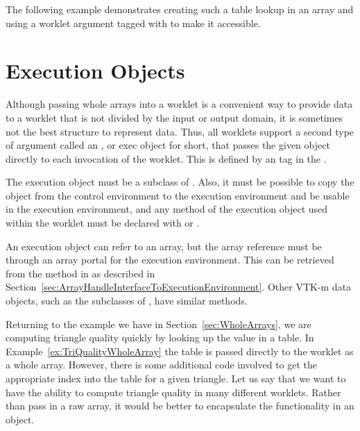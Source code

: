 The following example demonstrates creating such a table lookup in an array
and using a worklet argument tagged with  to make it
accessible.




\section{Execution Objects}
\label{sec:ExecutionObjects}


Although passing whole arrays into a worklet is a convenient way to provide
data to a worklet that is not divided by the input or output domain, it is
sometimes not the best structure to represent data. Thus, all worklets
support a second type of argument called an , or
exec object for short, that passes the given object directly to each
invocation of the worklet. This is defined by an  tag in
the \controlsignature.

The execution object must be a subclass of .
Also, it must be possible to copy the object from the control environment
to the execution environment and be usable in the execution environment,
and any method of the execution object used within the worklet must be
declared with \vtkmexecexport or \vtkmexeccontexport.

An execution object can refer to an array, but the array reference must be
through an array portal for the execution environment. This can be
retrieved from the  method in
 as described in
Section~\ref{sec:ArrayHandleInterfaceToExecutionEnvironment}. Other VTK-m
data objects, such as the subclasses of , have similar
methods.

Returning to the example we have in Section~\ref{sec:WholeArrays}, we are
computing triangle quality quickly by looking up the value in a table. In
Example~\ref{ex:TriQualityWholeArray} the table is passed directly to the
worklet as a whole array. However, there is some additional code involved
to get the appropriate index into the table for a given triangle. Let us
say that we want to have the ability to compute triangle quality in many
different worklets. Rather than pass in a raw array, it would be better to
encapsulate the functionality in an object.

